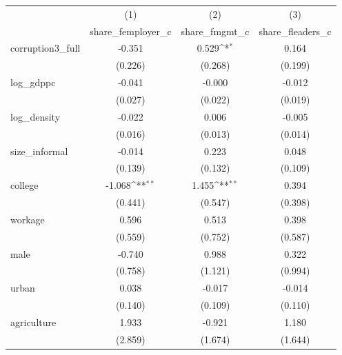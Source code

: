 {
\def\sym#1{\ifmmode^{#1}\else\(^{#1}\)\fi}
\begin{tabular}{l*{3}{c}}
\hline\hline
            &\multicolumn{1}{c}{(1)}&\multicolumn{1}{c}{(2)}&\multicolumn{1}{c}{(3)}\\
            &\multicolumn{1}{c}{share\_femployer\_c}&\multicolumn{1}{c}{share\_fmgmt\_c}&\multicolumn{1}{c}{share\_fleaders\_c}\\
\hline
corruption3\_full&      -0.351         &       0.529\sym{*}  &       0.164         \\
            &     (0.226)         &     (0.268)         &     (0.199)         \\
[1em]
log\_gdppc   &      -0.041         &      -0.000         &      -0.012         \\
            &     (0.027)         &     (0.022)         &     (0.019)         \\
[1em]
log\_density &      -0.022         &       0.006         &      -0.005         \\
            &     (0.016)         &     (0.013)         &     (0.014)         \\
[1em]
size\_informal&      -0.014         &       0.223         &       0.048         \\
            &     (0.139)         &     (0.132)         &     (0.109)         \\
[1em]
college     &      -1.068\sym{**} &       1.455\sym{**} &       0.394         \\
            &     (0.441)         &     (0.547)         &     (0.398)         \\
[1em]
workage     &       0.596         &       0.513         &       0.398         \\
            &     (0.559)         &     (0.752)         &     (0.587)         \\
[1em]
male        &      -0.740         &       0.988         &       0.322         \\
            &     (0.758)         &     (1.121)         &     (0.994)         \\
[1em]
urban       &       0.038         &      -0.017         &      -0.014         \\
            &     (0.140)         &     (0.109)         &     (0.110)         \\
[1em]
agriculture &       1.933         &      -0.921         &       1.180         \\
            &     (2.859)         &     (1.674)         &     (1.644)         \\

\end{tabular}}
